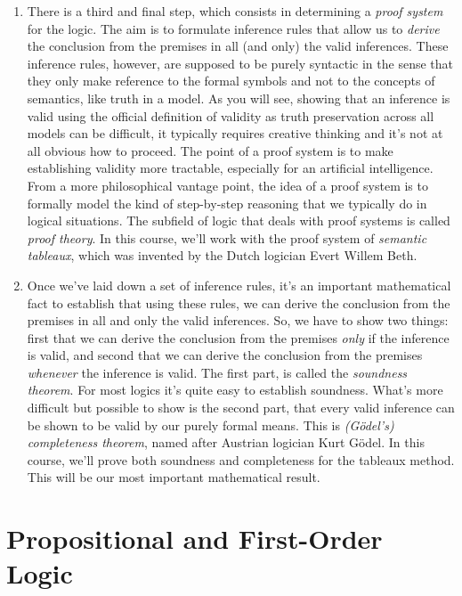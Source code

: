 \begin{enumerate}[\thesection.1]
	\item There is a third and final step, which consists in determining a \emph{proof system} for the logic. The aim is to formulate inference rules that allow us to \emph{derive} the conclusion from the premises in all (and only) the valid inferences. These inference rules, however, are supposed to be purely syntactic in the sense that they only make reference to the formal symbols and not to the concepts of semantics, like truth in a model. As you will see, showing that an inference is valid using the official definition of validity as truth preservation across all models can be difficult, it typically requires creative thinking and it's not at all obvious how to proceed. The point of a proof system is to make establishing validity more tractable, especially for an artificial intelligence. From a more philosophical vantage point, the idea of a proof system is to formally model the kind of step-by-step reasoning that we typically do in logical situations. The subfield of logic that deals with proof systems is called \emph{proof theory}. In this course, we'll work with the proof system of \emph{semantic tableaux}, which was invented by the Dutch logician Evert Willem Beth.
	
	\item Once we've laid down a set of inference rules, it's an important mathematical fact to establish that using these rules, we can derive the conclusion from the premises in all and only the valid inferences. So, we have to show two things: first that we can derive the conclusion from the premises \emph{only} if the inference is valid, and second that we can derive the conclusion from the premises \emph{whenever} the inference is valid. The first part, is called the \emph{soundness theorem}. For most logics it's quite easy to establish soundness. What's more difficult but possible to show is the second part, that every valid inference can be shown to be valid by our purely formal means. This is \emph{(G\"odel's) completeness theorem}, named after Austrian logician Kurt G\"odel. In this course, we'll prove both soundness and completeness for the tableaux method. This will be our most important mathematical result.
				
\end{enumerate}

\section{Propositional and First-Order Logic}

